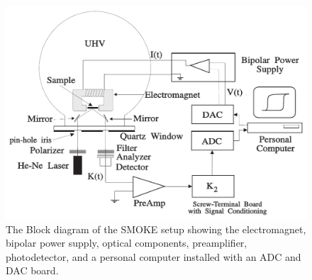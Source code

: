 \documentclass[11pt]{article}
\begin{document}
%
\begin{figure}
\centering
\includegraphics{smokeblk}
\caption{The Block diagram of the SMOKE setup showing the electromagnet,
bipolar power supply, optical components, preamplifier, photodetector, 
and a personal computer installed with an ADC and DAC board.}
\end{figure}
  
\end{document}
